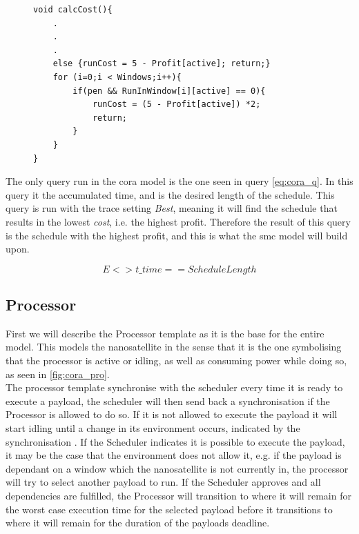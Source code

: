 \begin{figure}[h]
	\begin{lstlisting}[language=my_c, caption={Function calcCost(), used for calculating the cost rate}, label=lst:calcCost]
void calcCost(){
	.
	.
	.
	else {runCost = 5 - Profit[active]; return;}
	for (i=0;i < Windows;i++){ 
		if(pen && RunInWindow[i][active] == 0){
			runCost = (5 - Profit[active]) *2;
			return;
		} 
	}
}	
	\end{lstlisting}
\end{figure}


The only query run in the \gls{cora} model is the one seen in query \ref{eq:cora_q}. In this query  it the accumulated time, and  is the desired length of the schedule. This query is run with the trace setting \textit{Best}, meaning it will find the schedule that results in the lowest \textit{cost}, i.e. the highest profit. 
Therefore the result of this query is the schedule with the highest profit, and this is what the \gls{smc} model will build upon.

\begin{equation} \label{eq:cora_q}
E<> t\_time == ScheduleLength
\end{equation}

\subsection*{Processor}\label{ssec:cora_pro}
First we will describe the Processor template as it is the base for the entire model. This models the nanosatellite in the sense that it is the one symbolising that the processor is active or idling, as well as consuming power while doing so, as seen in \cref{fig:cora_pro}. \\
The processor template synchronise with the scheduler every time it is ready to execute a payload, the scheduler will then send back a synchronisation if the Processor is allowed to do so. If it is not allowed to execute the payload it will start idling until a change in its environment occurs, indicated by the synchronisation . 
If the Scheduler indicates it is possible to execute the payload, it may be the case that the environment does not allow it, e.g. if the payload is dependant on a window which the nanosatellite is not currently in, the processor will try to select another payload to run. If the Scheduler approves and all dependencies are fulfilled, the Processor will transition to  where it will remain for the worst case execution time for the selected payload before it transitions to  where it will remain for the duration of the payloads deadline.

